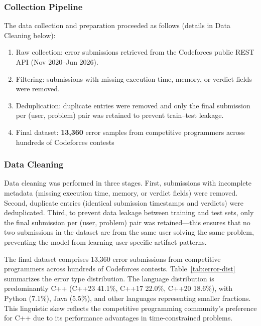 \documentclass[acmsmall]{acmart}
\begin{document}
\subsubsection*{Collection Pipeline}
The data collection and preparation proceeded as follows (details in
Data Cleaning below):
\begin{enumerate}
 \item Raw collection: error submissions retrieved from the
 Codeforces public REST API (Nov 2020--Jun 2026).
 \item Filtering: submissions with missing execution time, memory, or
 verdict fields were removed.
 \item Deduplication: duplicate entries were removed and only the final
 submission per (user, problem) pair was retained to prevent
 train--test leakage.
 \item Final dataset: \textbf{13,360} error samples from competitive
 programmers across hundreds of Codeforces contests
\end{enumerate}

\subsubsection*{Data Cleaning}
Data cleaning was performed in three stages. First, submissions with
incomplete metadata (missing execution time, memory, or verdict fields) were
removed. Second, duplicate entries (identical submission timestamps and
verdicts) were deduplicated. Third, to prevent data leakage between training
and test sets, only the final submission per (user, problem) pair was
retained---this ensures that no two submissions in the dataset are from the
same user solving the same problem, preventing the model from learning
user-specific artifact patterns.

The final dataset comprises 13,360 error submissions from competitive programmers
across hundreds of Codeforces contests. Table~\ref{tab:error-dist} summarizes
the error type distribution. The language distribution
is predominantly C++ (C++23 41.1\%, C++17 22.0\%, C++20 18.6\%), with
Python (7.1\%), Java (5.5\%), and other languages representing smaller
fractions. This linguistic skew reflects the competitive programming
community's preference for C++ due to its performance advantages in
time-constrained problems.
\end{document}
